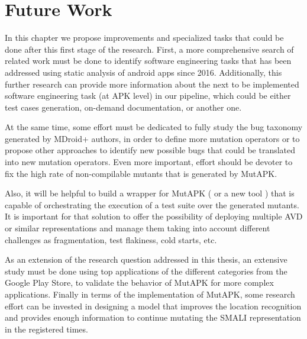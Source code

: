 
\chapter{Future Work} %

\label{ChapterFutureWork} %

In this chapter we propose improvements and specialized tasks that could be done after this first stage of the research. First, a more comprehensive search of related work must be done to identify software engineering tasks that has been addressed using static analysis of android apps since 2016. Additionally, this further research can provide more information about the next to be implemented software engineering task (at APK level) in our pipeline, which could be either test cases generation, on-demand documentation, or another one.

At the same time, some effort must be dedicated to fully study the bug taxonomy generated by MDroid+ authors, in order to define more mutation operators or to propose other approaches to identify new possible bugs that could be translated into new mutation operators. Even more important, effort should be devoter to fix the high rate of non-compilable mutants that is generated by MutAPK.

Also, it will be helpful to build a wrapper for MutAPK ( or a new tool ) that is capable of orchestrating the execution of a test suite over the generated mutants. It is important for that solution to offer the possibility of deploying multiple AVD or similar representations and manage them taking into account different challenges as fragmentation, test flakiness, cold starts, etc. \cite{8094439}

As an extension of the research question addressed in this thesis, an extensive study must be done using top applications of the different categories from the Google Play Store, to validate the behavior of MutAPK for more complex applications.
Finally in terms of the implementation of MutAPK, some research effort can be invested in designing a model that improves the location recognition and provides enough information to continue mutating the SMALI representation in the registered times.